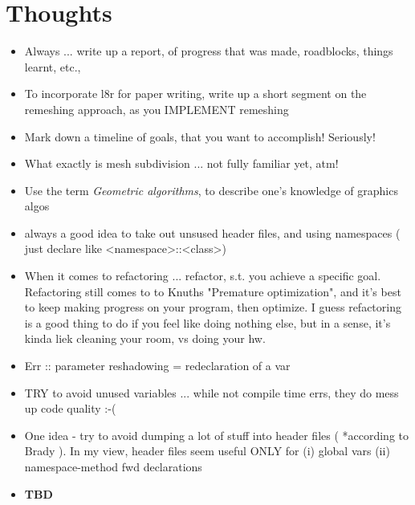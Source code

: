 \documentclass{article}
\begin{document}
\section{Thoughts}
\begin{itemize}
	\item Always ... write up a report, of progress that was made, roadblocks, things learnt, etc., 
	\item To incorporate l8r for paper writing, write up a short segment on the remeshing approach, as you IMPLEMENT remeshing
	\item Mark down a timeline of goals, that you want to accomplish! Seriously!
	\item What exactly is mesh subdivision ... not fully familiar yet, atm!
	\item Use the term \textit{Geometric algorithms}, to describe one's knowledge of graphics algos
	\item always a good idea to take out unsused header files, and using namespaces ( just declare like <namespace>::<class>)
	\item When it comes to refactoring ... refactor, s.t. you achieve a specific goal. Refactoring still comes to to Knuths "Premature optimization", and it's best to keep making progress on your program, then optimize. I guess refactoring is a good thing to do if you feel like doing nothing else, but in a sense, it's kinda liek cleaning your room, vs doing your hw.
	\item Err :: parameter reshadowing = redeclaration of a var
	\item TRY to avoid unused variables ... while not compile time errs, they do mess up code quality :-(
	\item One idea - try to avoid dumping a lot of stuff into header files ( *according to Brady ). In my view, header files seem useful ONLY for (i) global vars (ii) namespace-method fwd declarations
	\item \textbf{TBD} 
\end{itemize}
\end{document}
